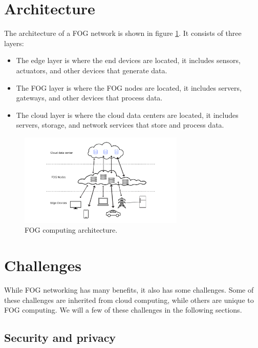 \section{Architecture}
\label{sec:fog-architecture}

The architecture of a FOG network is shown in figure \ref{fig:fog-architecture}. It consists of three layers:
\begin{itemize}
	\item The edge layer is where the end devices are located, it includes sensors, actuators, and other devices that
	      generate data.
	\item The FOG layer is where the FOG nodes are located, it includes servers, gateways, and other devices that
	      process data.
	\item The cloud layer is where the cloud data centers are located, it includes servers, storage, and network
	      services that store and process data.
\end{itemize}

\begin{figure}[H]
	\centering
	\includegraphics[width=0.70\textwidth]{../images/FOG_network_ink.png}
	\caption{FOG computing architecture.}
	\label{fig:fog-architecture}
\end{figure}

\section{Challenges}
\label{sec:fog-challenges}

While FOG networking has many benefits, it also has some challenges. Some of these challenges are inherited from cloud
computing, while others are unique to FOG computing. We will a few of these challenges in the following sections.

\subsection{Security and privacy}
\label{subsec:fog-security}

